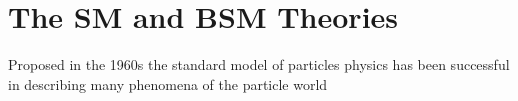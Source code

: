 \chapter{The SM and BSM Theories}\label{ch:smandbsm}

Proposed in the 1960s the standard model of particles physics has been successful in describing many phenomena of the particle world
